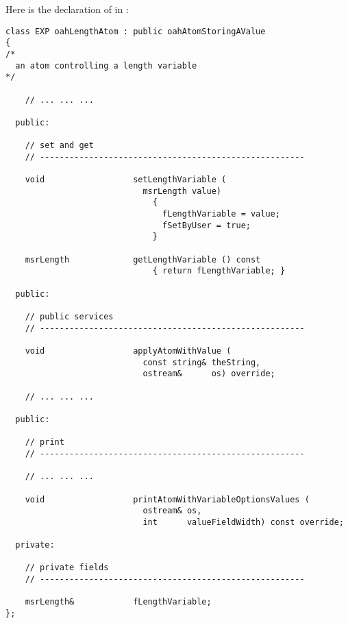 Here is the declaration of  in :
\begin{lstlisting}[language=CPlusPlus]
class EXP oahLengthAtom : public oahAtomStoringAValue
{
/*
  an atom controlling a length variable
*/

	// ... ... ...

  public:

    // set and get
    // ------------------------------------------------------

    void                  setLengthVariable (
                            msrLength value)
                              {
                                fLengthVariable = value;
                                fSetByUser = true;
                              }

    msrLength             getLengthVariable () const
                              { return fLengthVariable; }

  public:

    // public services
    // ------------------------------------------------------

    void                  applyAtomWithValue (
                            const string& theString,
                            ostream&      os) override;

	// ... ... ...

  public:

    // print
    // ------------------------------------------------------

	// ... ... ...

    void                  printAtomWithVariableOptionsValues (
                            ostream& os,
                            int      valueFieldWidth) const override;

  private:

    // private fields
    // ------------------------------------------------------

    msrLength&            fLengthVariable;
};
\end{lstlisting}

